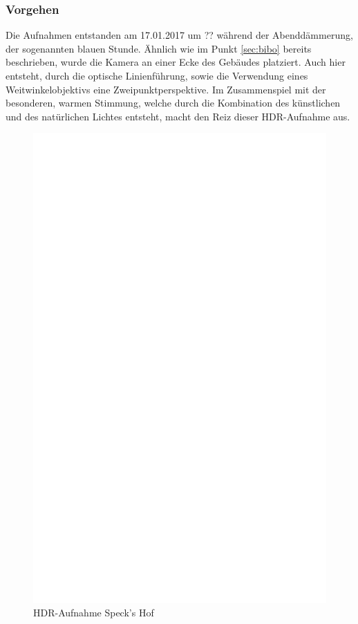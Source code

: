 \documentclass[liststotoc,bibtotoc,fontsize=14pt,]{scrreprt}
\begin{document}
			
	\subsubsection{Vorgehen}
	Die Aufnahmen entstanden am 17.01.2017 um ?? während der Abend\-dämmerung, der sogenannten blauen Stunde. Ähnlich wie im Punkt 	\ref{sec:bibo} bereits beschrieben, wurde die Kamera an einer Ecke des Gebäudes platziert. Auch hier entsteht, durch die optische Linienführung, sowie die Verwendung eines Weitwinkelobjektivs eine Zweipunktperspektive. Im Zusammenspiel mit der besonderen, warmen Stimmung, welche durch die Kombination des künstlichen und des natürlichen Lichtes entsteht, macht den Reiz dieser  HDR-Aufnahme aus.
			
		
					 \newpage
					 \begin{figure}[h]
					 	\includegraphics[width=\linewidth]{img/ph.jpg}
					 	\caption{HDR-Aufnahme Speck's Hof}
					 \end{figure}
			
\end{document}

